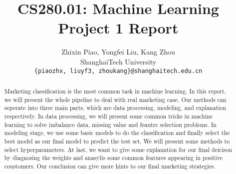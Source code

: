 \documentclass[10pt,twocolumn,letterpaper]{article}
\begin{document}
\title{CS280.01: Machine Learning\\ Project 1 Report}

\author{Zhixin Piao, Yongfei Liu, Kang Zhou\\
ShanghaiTech University\\
{\tt\small { \{piaozhx, liuyf3, zhoukang\}@shanghaitech.edu.cn}
}}




\maketitle

\begin{abstract}
   Marketing classification is the most common task in machine learning. In this report, we will present the whole pipeline to deal with real marketing case. Our methods can seperate into three main parts, which are data processing, modeling, and explanation respectively. In data processing, we will present some common tricks in machine learning to solve imbalance data, missing value and feautre selection problems. In modeling stage, we use some basic models to do the classification and finally select the best model as our final model to predict the test set. We will present some methods to select hyperparameters. At last, we want to give some explanation for our final deicison by diagnosing the weights and anasylis some common features appearing in positive coustomers. Our conclusion can give more hints to our final marketing strategies.
\end{abstract}








{\small


}
\end{document}
